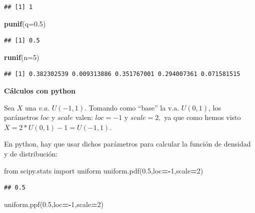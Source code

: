 \documentclass[]{book}
\newenvironment{Shaded}{\begin{snugshade}}{\end{snugshade}}
\newcommand{\DataTypeTok}[1]{\textcolor[rgb]{0.13,0.29,0.53}{#1}}
\newcommand{\DecValTok}[1]{\textcolor[rgb]{0.00,0.00,0.81}{#1}}
\newcommand{\FloatTok}[1]{\textcolor[rgb]{0.00,0.00,0.81}{#1}}
\newcommand{\ImportTok}[1]{#1}
\newcommand{\KeywordTok}[1]{\textcolor[rgb]{0.13,0.29,0.53}{\textbf{#1}}}
\newcommand{\NormalTok}[1]{#1}
\newcommand{\OperatorTok}[1]{\textcolor[rgb]{0.81,0.36,0.00}{\textbf{#1}}}
\begin{document}
\begin{verbatim}
## [1] 1
\end{verbatim}

\begin{Shaded}
\begin{Highlighting}[]
\KeywordTok{punif}\NormalTok{(}\DataTypeTok{q=}\FloatTok{0.5}\NormalTok{)}
\end{Highlighting}
\end{Shaded}

\begin{verbatim}
## [1] 0.5
\end{verbatim}

\begin{Shaded}
\begin{Highlighting}[]
\KeywordTok{runif}\NormalTok{(}\DataTypeTok{n=}\DecValTok{5}\NormalTok{)}
\end{Highlighting}
\end{Shaded}

\begin{verbatim}
## [1] 0.382302539 0.009313886 0.351767001 0.294007361 0.071581515
\end{verbatim}

\textbf{Cálculos con python}

Sea \(X\) una \(v.a.\) \(U(-1,1)\). Tomando como ``base'' la v.a. \(U(0,1)\), los parámetros \(loc\) y \(scale\) valen: \(loc=-1\) y \(scale=2,\) ya que como hemos visto \(X=2*U(0,1)-1=U(-1,1)\).

En python, hay que usar dichos parámetros para calcular la función de densidad y de distribución:

\begin{Shaded}
\begin{Highlighting}[]
\ImportTok{from}\NormalTok{ scipy.stats }\ImportTok{import}\NormalTok{ uniform}
\NormalTok{uniform.pdf(}\FloatTok{0.5}\NormalTok{,loc}\OperatorTok{=-}\DecValTok{1}\NormalTok{,scale}\OperatorTok{=}\DecValTok{2}\NormalTok{)}
\end{Highlighting}
\end{Shaded}

\begin{verbatim}
## 0.5
\end{verbatim}

\begin{Shaded}
\begin{Highlighting}[]
\NormalTok{uniform.ppf(}\FloatTok{0.5}\NormalTok{,loc}\OperatorTok{=-}\DecValTok{1}\NormalTok{,scale}\OperatorTok{=}\DecValTok{2}\NormalTok{)}
\end{Highlighting}
\end{Shaded}
\end{document}

